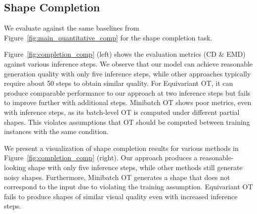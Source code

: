 \vspace{-3mm}
\subsection{Shape Completion}
\vspace{-3mm}
\label{subsec:shape_completion}



We evaluate against the same baselines from Figure~\ref{fig:main_quantitative_comp} for the shape completion task.


Figure~\ref{fig:completion_comp} (left) shows the evaluation metrics (CD \& EMD) against various inference steps.
%
We observe that our model can achieve reasonable generation quality with only five inference steps, while other approaches typically require about 50 steps to obtain similar quality.
%
For Equivariant OT, it can produce comparable performance to our approach at two inference steps but fails to improve further with additional steps.
%
Minibatch OT shows poor metrics, even with inference steps, as its batch-level OT is computed under different partial shapes. 
%
This violates assumptions that OT should be computed between training instances with the same condition.

We present a visualization of shape completion results for various methods in Figure~\ref{fig:completion_comp} (right).
%
Our approach produces a reasonable-looking shape with only five inference steps, while other methods still generate noisy shapes.
%
Furthermore, Minibatch OT generates a shape that does not correspond to the input due to violating the training assumption. 
%
Equivariant OT fails to produce shapes of similar visual quality even with increased inference steps.
